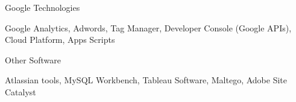 \begin{cventries}
	\zcventry
	{Google Technologies} %
	{
		\begin{cvitems} %
			\item {Google Analytics, Adwords, Tag Manager, Developer Console (Google APIs), Cloud Platform, Apps Scripts}
		\end{cvitems}
	}
	
	\zcventry
	{Other Software} %
	{
		\begin{cvitems} %
			\item {Atlassian tools, MySQL Workbench, Tableau Software, Maltego, Adobe Site Catalyst}
		\end{cvitems}
	}
	
\end{cventries}